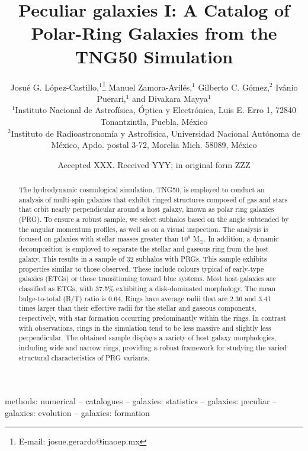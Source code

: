 \documentclass[fleqn,usenatbib]{mnras}
\title[PRG-galaxy catalog]{ Peculiar galaxies I: A Catalog of Polar-Ring Galaxies from the TNG50 Simulation}
\author[J. G. López-Castillo et al.]{
Josué G. López-Castillo,$^{1}$\thanks{E-mail: josue.gerardo@inaoep.mx} 
Manuel Zamora-Avilés,$^{1}$ 
Gilberto C. Gómez,$^{2}$ 
Ivânio Puerari,$^{1}$  
\newauthor
and Divakara Mayya$^{1}$ 
\\
$^{1}$Instituto Nacional de Astrofísica, Óptica y Electrónica, Luis E. Erro 1, 72840 Tonantzintla, Puebla, México\\
$^{2}$Instituto de Radioastronomía y Astrofísica, Universidad Nacional Autónoma de México, Apdo. postal 3-72, Morelia Mich. 58089, México\\
}
\date{Accepted XXX. Received YYY; in original form ZZZ}
\begin{document}
\label{firstpage}
\pagerange{\pageref{firstpage}--\pageref{lastpage}}
\maketitle

\begin{abstract}
    The hydrodynamic cosmological simulation, TNG50, is employed to conduct an analysis of multi-spin galaxies that exhibit ringed structures composed of gas and stars that orbit nearly perpendicular around a host galaxy, known as polar ring galaxies (PRG). To ensure a robust sample, we select subhalos based on the angle subtended by the angular momentum profiles, as well as on a visual inspection. The analysis is focused on galaxies with stellar masses greater than 10$^{9}$ M$_\odot$. In addition, a dynamic decomposition is employed to separate the stellar and gaseous ring from the host galaxy. This results in a sample of 32 subhalos with PRGs. This sample exhibits properties similar to those observed. These include colours typical of early-type galaxies (ETGs) or those transitioning toward blue systems. Most host galaxies are classified as ETGs, with 37.5\% exhibiting a disk-dominated morphology. The mean bulge-to-total (B/T) ratio is 0.64. Rings have average radii that are 2.36 and 3.41 times larger than their effective radii for the stellar and gaseous components, respectively, with star formation occurring predominantly within the rings. In contrast with observations, rings in the simulation tend to be less massive and slightly less perpendicular. The obtained sample displays a variety of host galaxy morphologies, including wide and narrow rings, providing a robust framework for studying the varied structural characteristics of PRG variants.
\end{abstract}

\begin{keywords}
methods: numerical -- catalogues -- galaxies: statistics -- galaxies: peculiar -- galaxies: evolution -- galaxies: formation
\end{keywords}


\end{document}
